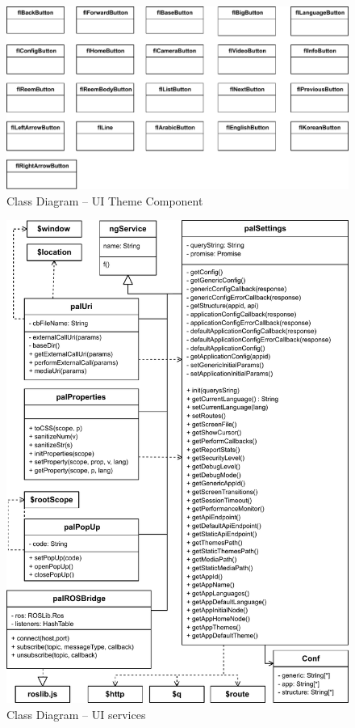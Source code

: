 \begin{figure}
    \centering
    \includegraphics{figures/design-class-themecomponents.pdf}
    \caption{Class Diagram -- UI Theme Component}
    \label{fig:class-themecomponent}
\end{figure}

\begin{figure}[htb]
    \centering
    \includegraphics{figures/design-class-services.pdf}
    \caption{Class Diagram -- UI services}
    \label{fig:class-services}
\end{figure}

